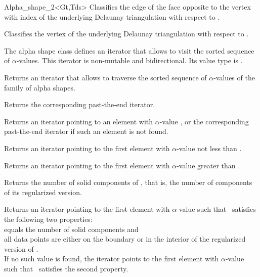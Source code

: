 \begin{ccClassTemplate} {Alpha_shape_2<Gt,Tds>}
{Classifies the edge of the face  opposite to the vertex with index  of the underlying Delaunay triangulation with respect to \ccVar.}	

{Classifies the vertex  of the underlying Delaunay triangulation with respect to \ccVar.}



\smallskip
The alpha shape class defines an iterator that allows to visit the
sorted sequence of $\alpha$-values. This iterator is
non-mutable and bidirectional. Its value type is
.

{Returns an iterator that allows to traverse the
sorted sequence of $\alpha$-values of the family of alpha shapes.}

{Returns the corresponding past-the-end iterator.}

{Returns an iterator pointing to an element with $\alpha$-value
, or the corresponding past-the-end iterator if such 
an element is not found.}

{Returns an iterator pointing to the first element with
$\alpha$-value not less than .}

{Returns an iterator pointing to the first element with $\alpha$-value
greater than .}


{Returns the number of solid components of \ccVar, that is, the number of components of its regularized version.}

{Returns an iterator pointing to the first element with $\alpha$-value
such that \ccVar\ satisfies the following two properties:\\
 equals the number of solid components and \\
all data points are either on the boundary or in the interior of the regularized version of \ccVar.\\
If no such value is found, the iterator points to the first element with 
$\alpha$-value such that \ccVar\ satisfies the second property.}


\end{ccClassTemplate}

